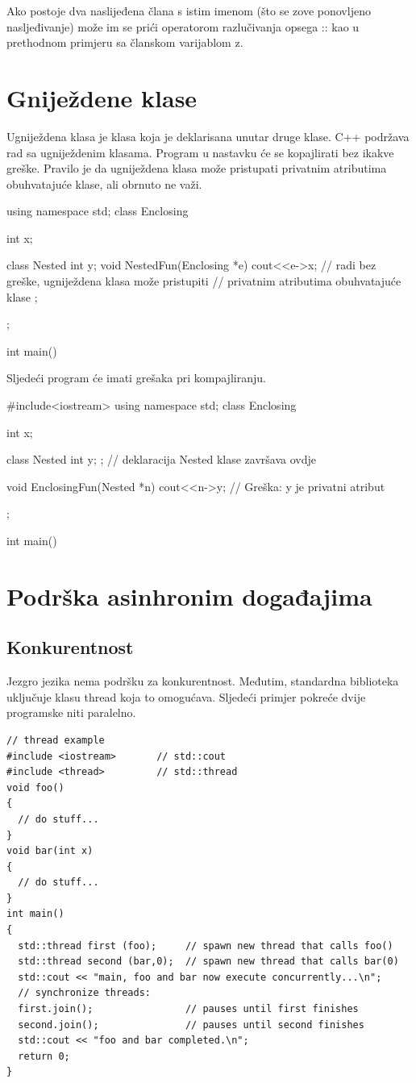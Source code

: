 \documentclass[11pt]{book}
\begin{document}
Ako postoje dva naslijeđena člana s istim imenom (što se zove ponovljeno nasljeđivanje) može im se prići operatorom razlučivanja opsega :: kao u prethodnom primjeru sa članskom varijablom z.


\section{Gniježdene klase}
Ugniježdena klasa je klasa koja je deklarisana unutar druge klase. C++ podržava rad sa ugniježdenim klasama. Program u nastavku će se kopajlirati bez ikakve greške. Pravilo je da ugniježdena klasa može pristupati privatnim atributima obuhvatajuće klase, ali obrnuto ne važi.

\begin{shortlisting}
  using namespace std;
  class Enclosing {
      int x;

      class Nested {
          int y;
          void NestedFun(Enclosing *e) {
              cout<<e->x;  // radi bez greške, ugniježdena klasa može pristupiti
              // privatnim atributima obuhvatajuće klase
            }
        };
    };

  int main(){ }
\end{shortlisting}
Sljedeći program će imati grešaka pri kompajliranju.
\begin{shortlisting}
  #include<iostream>
  using namespace std;
  class Enclosing {
      int x;

      class Nested {
          int y;
        }; // deklaracija Nested klase završava ovdje

      void EnclosingFun(Nested *n) {
          cout<<n->y;  // Greška: y je privatni atribut
        }
    };

  int main(){}
\end{shortlisting}




\section{Podrška asinhronim događajima}

\subsection{Konkurentnost}
Jezgro jezika nema podršku za konkurentnost. Međutim, standardna biblioteka uključuje klasu thread koja to omogućava. Sljedeći primjer pokreće dvije programske niti paralelno.

\begin{lstlisting}
// thread example
#include <iostream>       // std::cout
#include <thread>         // std::thread
void foo() 
{
  // do stuff...
}
void bar(int x)
{
  // do stuff...
}
int main() 
{
  std::thread first (foo);     // spawn new thread that calls foo()
  std::thread second (bar,0);  // spawn new thread that calls bar(0)
  std::cout << "main, foo and bar now execute concurrently...\n";
  // synchronize threads:
  first.join();                // pauses until first finishes
  second.join();               // pauses until second finishes
  std::cout << "foo and bar completed.\n";
  return 0;
}
\end{lstlisting}
\end{document}
